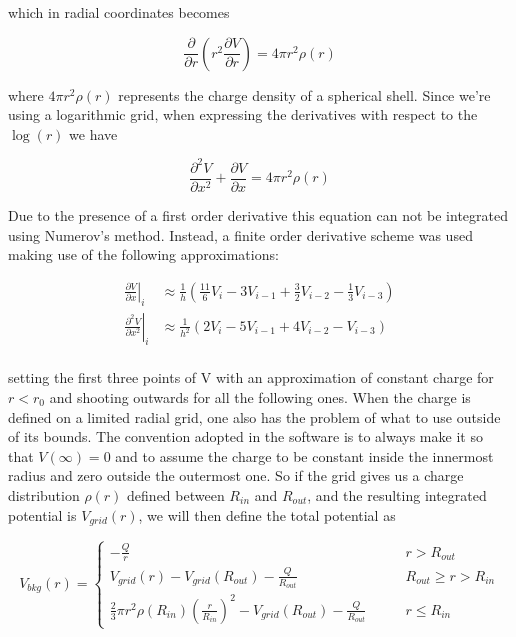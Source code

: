 \documentclass[]{report}
\begin{document}
which in radial coordinates becomes

\begin{equation}
	\frac{\partial}{\partial r}\left(r^2	\frac{\partial V}{\partial r}\right) = 4\pi r^2 \rho(r)
\end{equation}

where $4\pi r^2 \rho(r)$ represents the charge density of a spherical shell. Since we're using a logarithmic grid, when expressing the derivatives with respect to the $\log(r)$ we have

\begin{equation}
\frac{\partial^2 V}{\partial x^2} + \frac{\partial V}{\partial x}= 4\pi r^2 \rho(r)
\end{equation}

Due to the presence of a first order derivative this equation can not be integrated using Numerov's method. Instead, a finite order derivative scheme was used making use of the following approximations:

\begin{align}
\left.\frac{\partial V}{\partial x}\right|_i &\approx \frac{1}{h}\left(\frac{11}{6}V_i -3V_{i-1} +\frac{3}{2}V_{i-2}-\frac{1}{3}V_{i-3} \right) \\
\left.\frac{\partial^2 V}{\partial x^2}\right|_i &\approx \frac{1}{h^2}\left(2V_i -5V_{i-1} +4V_{i-2}-V_{i-3} \right) \\
\end{align}

setting the first three points of V with an approximation of constant charge for $r < r_0$ and shooting outwards for all the following ones.\newline 
When the charge is defined on a limited radial grid, one also has the problem of what to use outside of its bounds. The convention adopted in the software is to always make it so that $V(\infty) = 0$ and to assume the charge to be constant inside the innermost radius and zero outside the outermost one. So if the grid gives us a charge distribution $\rho(r)$ defined between $R_{in}$ and $R_{out}$, and the resulting integrated potential is $V_{grid}(r)$, we will then define the total potential as

\begin{equation}
V_{bkg}(r) = \begin{cases}
-\frac{Q}{r}\qquad & r > R_{out} \\
V_{grid}(r) -V_{grid}(R_{out}) - \frac{Q}{R_{out}} \qquad & R_{out} \geq r > R_{in} \\
\frac{2}{3}\pi r^2\rho(R_{in})\left(\frac{r}{R_{in}}\right)^2-V_{grid}(R_{out}) - \frac{Q}{R_{out}} \qquad & r \leq R_{in}
\end{cases}
\end{equation} 
\end{document}
